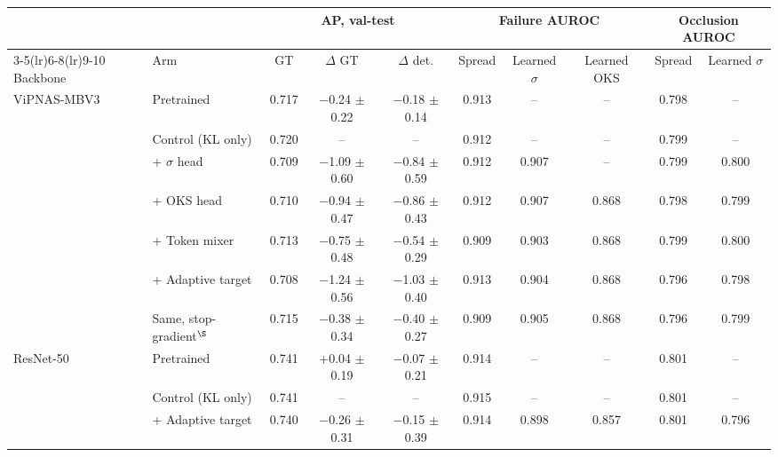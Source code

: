 \begin{tabular}{llcccccccc}
\toprule
& & \multicolumn{3}{c}{AP, val-test} & \multicolumn{3}{c}{Failure AUROC} & \multicolumn{2}{c}{Occlusion AUROC} \\
\cmidrule(lr){3-5}\cmidrule(lr){6-8}\cmidrule(lr){9-10}
Backbone & Arm & GT & $\Delta$ GT & $\Delta$ det. & Spread & Learned $\sigma$ & Learned OKS & Spread & Learned $\sigma$ \\
\midrule
ViPNAS-MBV3 & Pretrained & 0.717 & \ensuremath{-}0.24 $\pm$ 0.22 & \ensuremath{-}0.18 $\pm$ 0.14 & 0.913 & -- & -- & 0.798 & -- \\
 & Control (KL only) & 0.720 & -- & -- & 0.912 & -- & -- & 0.799 & -- \\
 & + $\sigma$ head & 0.709 & \ensuremath{-}1.09 $\pm$ 0.60 & \ensuremath{-}0.84 $\pm$ 0.59 & 0.912 & 0.907 & -- & 0.799 & 0.800 \\
 & + OKS head & 0.710 & \ensuremath{-}0.94 $\pm$ 0.47 & \ensuremath{-}0.86 $\pm$ 0.43 & 0.912 & 0.907 & 0.868 & 0.798 & 0.799 \\
 & + Token mixer & 0.713 & \ensuremath{-}0.75 $\pm$ 0.48 & \ensuremath{-}0.54 $\pm$ 0.29 & 0.909 & 0.903 & 0.868 & 0.799 & 0.800 \\
 & + Adaptive target & 0.708 & \ensuremath{-}1.24 $\pm$ 0.56 & \ensuremath{-}1.03 $\pm$ 0.40 & 0.913 & 0.904 & 0.868 & 0.796 & 0.798 \\
 & Same, stop-gradient$^{\S}$ & 0.715 & \ensuremath{-}0.38 $\pm$ 0.34 & \ensuremath{-}0.40 $\pm$ 0.27 & 0.909 & 0.905 & 0.868 & 0.796 & 0.799 \\
\midrule
ResNet-50 & Pretrained & 0.741 & +0.04 $\pm$ 0.19 & \ensuremath{-}0.07 $\pm$ 0.21 & 0.914 & -- & -- & 0.801 & -- \\
 & Control (KL only) & 0.741 & -- & -- & 0.915 & -- & -- & 0.801 & -- \\
 & + Adaptive target & 0.740 & \ensuremath{-}0.26 $\pm$ 0.31 & \ensuremath{-}0.15 $\pm$ 0.39 & 0.914 & 0.898 & 0.857 & 0.801 & 0.796 \\
\bottomrule
\end{tabular}
